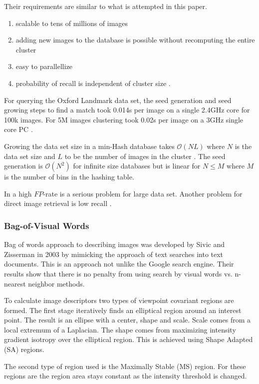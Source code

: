 \documentclass[english,12pt,a4paper,pdftex,elec,utf8, table]{aaltothesis}
\begin{document}
Their requirements are similar to what is attempted in this paper.

\begin{enumerate}
\item scalable to tens of millions of images
\item adding new images to the database is possible without recomputing the entire cluster
\item easy to parallellize
\item probability of recall is independent of cluster size \cite{Chum2010}.
\end{enumerate}

For querying the Oxford Landmark data set, the seed generation and seed growing steps to find a match took 0.014s per image on a single 2.4GHz core for 100k images. For 5M images clustering took 0.02s per image on a 3GHz single core PC \cite{Chum2010}.

Growing the data set size in a min-Hash database takes $\mathcal{O}(NL)$ where $N$ is the data set size and $L$ to be the number of images in the cluster \cite{Chum2010}. The seed generation is $\mathcal{O}(N^2)$ for infinite size databases but is linear for $N \leq M$ where $M$ is the number of bins in the hashing table.

In \cite{Lee2010} a high $FP$-rate is a serious problem for large data set. Another problem for direct image retrieval is low recall \cite{Chum2010}.

\subsubsection{Bag-of-Visual Words}\label{BOW}
Bag of words approach to describing images was developed by Sivic and Zisserman in 2003 by mimicking the approach of text searches into text documents. This is an approach not unlike the Google search engine. Their results show that there is no penalty from using search by visual words vs. n-nearest neighbor methods.\cite{Sivic2003}

To calculate image descriptors two types of viewpoint covariant regions are formed. The first stage iteratively finds an elliptical region around an interest point. The result is an ellipse with a center, shape and scale. Scale comes from a local extremum of a Laplacian. The shape comes from maximizing intensity gradient isotropy over the elliptical region. This is achieved using Shape Adapted (SA) regions.\cite{Sivic2003}

The second type of region used is the Maximally Stable (MS) region. For these regions are the region area stays constant as the intensity threshold is changed.
\end{document}
